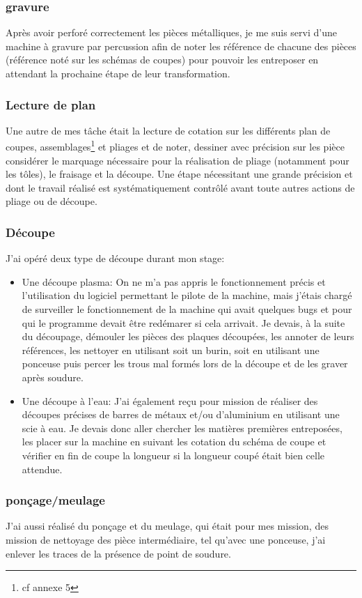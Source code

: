 \subsubsection{gravure}
Après avoir perforé correctement les pièces métalliques, je me suis servi d'une machine à gravure par percussion afin de noter les référence de chacune des pièces (référence noté sur les schémas de coupes) pour pouvoir les entreposer en attendant la prochaine étape de leur transformation.
\subsubsection{Lecture de plan}
Une autre de mes tâche était la lecture de cotation sur les différents plan de coupes, assemblages\footnote{cf annexe 5} et pliages et de noter, dessiner avec précision sur les pièce considérer le marquage nécessaire pour la réalisation de pliage (notamment pour les tôles), le fraisage et la découpe. Une étape nécessitant une grande précision et dont le travail réalisé est systématiquement contrôlé avant toute autres actions de pliage ou de découpe.
\subsubsection{Découpe}
J'ai opéré deux type de découpe durant mon stage:
\begin{itemize}
    \item Une découpe plasma: On ne m'a pas appris le fonctionnement précis et l'utilisation du logiciel permettant le pilote de la machine, mais j'étais chargé de surveiller le fonctionnement de la machine qui avait quelques bugs et pour qui le programme devait être redémarer si cela arrivait. Je devais, à la suite du découpage, démouler les pièces des plaques découpées, les annoter de leurs références, les nettoyer en utilisant soit un burin, soit en utilisant une ponceuse puis percer les trous mal formés lors de la découpe et de les graver après soudure.
    \item Une découpe à l'eau: J'ai également reçu pour mission de réaliser des découpes précises de barres de métaux et/ou d'aluminium en utilisant une scie à eau. Je devais donc aller chercher les matières premières entreposées, les placer sur la machine en suivant les cotation du schéma de coupe et vérifier en fin de coupe la longueur si la longueur coupé était bien celle attendue.
\end{itemize}
\subsubsection{ponçage/meulage}
J'ai aussi réalisé du ponçage et du meulage, qui était pour mes mission, des mission de nettoyage des pièce intermédiaire, tel qu'avec une ponceuse, j'ai enlever les traces de la présence de point de soudure.
